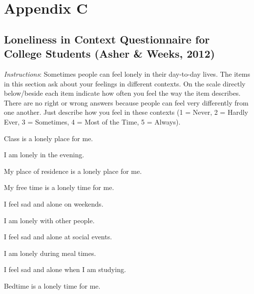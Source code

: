 \documentclass[
  english,
  man]{apa6}
\begin{document}
\section{Appendix C}\label{appendix-c}

\subsection{Loneliness in Context Questionnaire for College Students (Asher \& Weeks, 2012)}\label{loneliness-in-context-questionnaire-for-college-students-asher-weeks-2012}

\emph{Instructions}: Sometimes people can feel lonely in their day-to-day lives. The items in this section ask about your feelings in different contexts. On the scale directly below/beside each item indicate how often you feel the way the item describes. There are no right or wrong answers because people can feel very differently from one another. Just describe how you feel in these contexts (1 = Never, 2 = Hardly Ever, 3 = Sometimes, 4 = Most of the Time, 5 = Always).

Class is a lonely place for me.

I am lonely in the evening.

My place of residence is a lonely place for me.

My free time is a lonely time for me.

I feel sad and alone on weekends.

I am lonely with other people.

I feel sad and alone at social events.

I am lonely during meal times.

I feel sad and alone when I am studying.

Bedtime is a lonely time for me.
\end{document}
